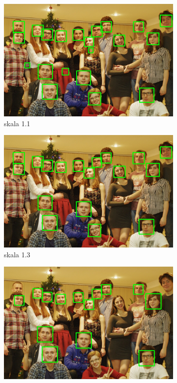 \begin{figure}[H]
    \centering
        \begin{subfigure}{0.32\textwidth}
        \centering
        \includegraphics[width=\linewidth]{imgs/twarze11.jpg}
        \caption{skala 1.1}
        \label{fig:twarzSkala11}
    \end{subfigure}\hfill
    \begin{subfigure}{0.32\textwidth}
        \centering
        \includegraphics[width=\linewidth]{imgs/twarze13.jpg}
        \caption{skala 1.3}
        \label{fig:twarzSkala13}
    \end{subfigure}\hfill
    \begin{subfigure}{0.32\textwidth}
        \centering
        \includegraphics[width=\linewidth]{imgs/twarze16.jpg}

\end{subfigure}
\end{figure}
